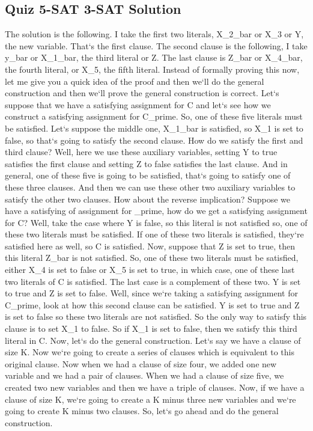 \subsection{Quiz  5-SAT 3-SAT Solution}
The solution is the following.
I take the first two literals, X\_2\_bar or X\_3 or Y, the new variable.
That`s the first clause.
The second clause is the following, I take y\_bar or X\_1\_bar, the third literal or Z\@.
The last clause is Z\_bar or X\_4\_bar, the fourth literal, or X\_5, the fifth literal.
Instead of formally proving this now, let me give you a quick idea of the proof and then we`ll do the general construction and then we`ll prove the general construction is correct.
Let`s suppose that we have a satisfying assignment for C and let`s see how we construct a satisfying assignment for C\_prime.
So, one of these five literals must be satisfied.
Let`s suppose the middle one, X\_1\_bar is satisfied, so X\_1 is set to false, so that`s going to satisfy the second clause.
How do we satisfy the first and third clause? Well, here we use these auxiliary variables, setting Y to true satisfies the first clause and setting Z to false satisfies the last clause.
And in general, one of these five is going to be satisfied, that`s going to satisfy one of these three clauses.
And then we can use these other two auxiliary variables to satisfy the other two clauses.
How about the reverse implication? Suppose we have a satisfying of assignment for \_prime, how do we get a satisfying assignment for C? Well, take the case where Y is false, so this literal is not satisfied so, one of these two literals must be satisfied.
If one of these two literals is satisfied, they`re satisfied here as well, so C is satisfied.
Now, suppose that Z is set to true, then this literal Z\_bar is not satisfied.
So, one of these two literals must be satisfied, either X\_4 is set to false or X\_5 is set to true, in which case, one of these last two literals of C is satisfied.
The last case is a complement of these two.
Y is set to true and Z is set to false.
Well, since we`re taking a satisfying assignment for C\_prime, look at how this second clause can be satisfied.
Y is set to true and Z is set to false so these two literals are not satisfied.
So the only way to satisfy this clause is to set X\_1 to false.
So if X\_1 is set to false, then we satisfy this third literal in C\@.
Now, let`s do the general construction.
Let`s say we have a clause of size K\@.
Now we`re going to create a series of clauses which is equivalent to this original clause.
Now when we had a clause of size four, we added one new variable and we had a pair of clauses.
When we had a clause of size five, we created two new variables and then we have a triple of clauses.
Now, if we have a clause of size K, we`re going to create a K minus three new variables and we`re going to create K minus two clauses.
So, let`s go ahead and do the general construction.

